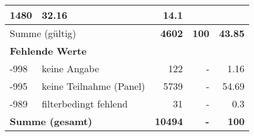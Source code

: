 \begin{longtable}{lXrrr}
       \num{1480} &
       \num[round-mode=places,round-precision=2]{32.16} &
         \num[round-mode=places,round-precision=2]{14.1} \\
     \midrule
     \multicolumn{2}{l}{Summe (gültig)} &
       \textbf{\num{4602}} &
     \textbf{\num{100}} &
       \textbf{\num[round-mode=places,round-precision=2]{43.85}} \\
     \multicolumn{5}{l}{\textbf{Fehlende Werte}}\\
       -998 &
       keine Angabe &
         \num{122} &
        - &
         \num[round-mode=places,round-precision=2]{1.16} \\
       -995 &
       keine Teilnahme (Panel) &
         \num{5739} &
        - &
         \num[round-mode=places,round-precision=2]{54.69} \\
       -989 &
       filterbedingt fehlend &
         \num{31} &
        - &
         \num[round-mode=places,round-precision=2]{0.3} \\
     \midrule
     \multicolumn{2}{l}{\textbf{Summe (gesamt)}} &
          \textbf{\num{10494}} &
        \textbf{-} &
        \textbf{\num{100}} \\
     \bottomrule
     \end{longtable}
     

